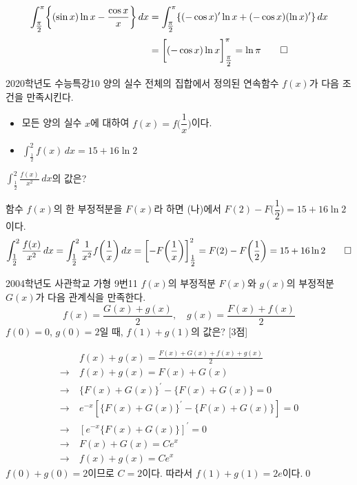 \documentclass{article}
\begin{document}
\begin{sol}
	\[
		\begin{aligned}
			\int_{\tfrac{\pi}{2}}^\pi\biggl\{(\sin x)\ln x-\frac{\cos x}{x}\biggr\}\,dx&=\int_{\tfrac{\pi}{2}}^\pi\{(-\cos x)^{\prime}\ln x+(-\cos x)(\ln x)^{\prime}\}\,dx\\[3pt]
			&=\biggl[(-\cos x)\ln x\biggr]_{\tfrac{\pi}{2}}^\pi=\ln\pi\qed
		\end{aligned}
	\]
\end{sol}

\newpage
\begin{prob}{2020학년도 수능특강}{10}
	양의 실수 전체의 집합에서 정의된 연속함수 $f(x)$가 다음 조건을 만족시킨다.
	\begin{hint}
		\begin{itemize}
			\item[(가)] 모든 양의 실수 $x$에 대하여 $f(x)=f\biggl(\dfrac{1}{x}\biggr)$이다.
			\item[(나)] $\displaystyle\int_{\tfrac{1}{2}}^2f(x)\,dx=15+16\ln2$
		\end{itemize}
	\end{hint}
	$\displaystyle\int_{\tfrac{1}{2}}^2\frac{f(x)}{x^2}\,dx$의 값은?
\end{prob}

\begin{sol}
	함수 $f(x)$의 한 부정적분을 $F(x)$라 하면 (나)에서 $F(2)-F\biggl(\dfrac{1}{2}\biggr)=15+16\ln2$이다.
	\[
		\int_{\tfrac{1}{2}}^2\frac{f(x)}{x^2}\,dx=\int_{\tfrac{1}{2}}^2\frac{1}{x^2}f\biggl(\frac{1}{x}\biggr)\,dx=\biggl[-F\biggl(\frac{1}{x}\biggr)\biggr]_{\tfrac{1}{2}}^2=F(2)-F\biggl(\frac{1}{2}\biggr)=15+16\ln2\qed
	\]
\end{sol}

\newpage
\begin{prob}{2004학년도 사관학교 가형 9번}{11}
	$f(x)$의 부정적분 $F(x)$와 $g(x)$의 부정적분 $G(x)$가 다음 관계식을 만족한다.
	\[
		f(x)=\frac{G(x)+g(x)}{2},\quad g(x)=\frac{F(x)+f(x)}{2}
	\]
	$f(0)=0$, $g(0)=2$일 때, $f(1)+g(1)$의 값은? [3점]
\end{prob}

\begin{sol}
	\[
		\begin{aligned}
			&f(x)+g(x)=\frac{F(x)+G(x)+f(x)+g(x)}{2}\\[3pt]
			\longrightarrow~&f(x)+g(x)=F(x)+G(x)\\[3pt]
			\longrightarrow~&\{F(x)+G(x)\}^{\prime}-\{F(x)+G(x)\}=0\\[3pt]
			\longrightarrow~&e^{-x}[\{F(x)+G(x)\}^{\prime}-\{F(x)+G(x)\}]=0\\[3pt]
			\longrightarrow~&[e^{-x}\{F(x)+G(x)\}]^{\prime}=0\\[3pt]
			\longrightarrow~&F(x)+G(x)=Ce^x\\[3pt]
			\longrightarrow~&f(x)+g(x)=Ce^x
		\end{aligned}
	\]
	$f(0)+g(0)=2$이므로 $C=2$이다. 따라서 $f(1)+g(1)=2e$이다.\qed
\end{sol}
\end{document}
